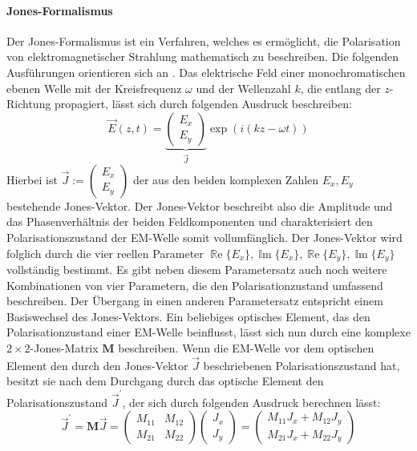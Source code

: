 \documentclass[titlepage,  ngerman]{article}
\renewcommand{\Re}{\operatorname{\mathbb{R}e}}
\renewcommand{\Im}{\operatorname{\mathbb{I}m}}
\begin{document}
	\paragraph{Jones-Formalismus}
	Der Jones-Formalismus ist ein Verfahren, welches es ermöglicht, die Polarisation von elektromagnetischer Strahlung mathematisch zu beschreiben. Die folgenden Ausführungen orientieren sich an \cite{Hecht.2018}. Das elektrische Feld einer monochromatischen ebenen Welle mit der Kreisfrequenz $\omega$ und der Wellenzahl $k$, die entlang der $z$-Richtung propagiert, lässt sich durch folgenden Ausdruck beschreiben:
	\begin{equation}
		\vec{E}(z, t) = \underbrace{\begin{pmatrix}E_x \\ E_y\end{pmatrix}}_{\vec{J}} \exp(i(kz-\omega t))
	\end{equation}
	Hierbei ist $\vec{J} := \begin{pmatrix}E_x \\ E_y\end{pmatrix}$ der aus den beiden komplexen Zahlen $E_x, E_y$ bestehende Jones-Vektor. Der Jones-Vektor beschreibt also die Amplitude und das Phasenverhältnis der beiden Feldkomponenten und charakterisiert den Polarisationszustand der EM-Welle somit vollumfänglich. Der Jones-Vektor wird folglich durch die vier reellen Parameter $\Re\{E_x\}, \Im\{E_x\}, \Re\{E_y\}, \Im\{E_y\}$ vollständig bestimmt. Es gibt neben diesem Parametersatz auch noch weitere Kombinationen von vier Parametern, die den Polarisationzustand umfassend beschreiben. Der Übergang in einen anderen Parametersatz entspricht einem Basiswechsel des Jones-Vektors.	Ein beliebiges optisches Element, das den Polarisationzustand einer EM-Welle beinflusst, lässt sich nun durch eine komplexe $2 \times 2$-Jones-Matrix $\boldsymbol{M}$ beschreiben. Wenn die EM-Welle vor dem optischen Element den durch den Jones-Vektor $\vec{J}$ beschriebenen Polarisationszustand hat, besitzt sie nach dem Durchgang durch das optische Element den Polarisationszustand $\vec{J}^\prime$, der sich durch folgenden Ausdruck berechnen lässt:
	\begin{equation}
		\vec{J}^\prime = \boldsymbol{M} \vec{J}  =  
		\begin{pmatrix}
			M_{11} & M_{12} \\
			M_{21} & M_{22}
		\end{pmatrix}
		\begin{pmatrix}
			J_x \\
			J_y
		\end{pmatrix} = 
		\begin{pmatrix}
			M_{11} J_x + M_{12} J_y \\
			M_{21} J_x + M_{22} J_y
		\end{pmatrix}		
	\end{equation}
\end{document}
